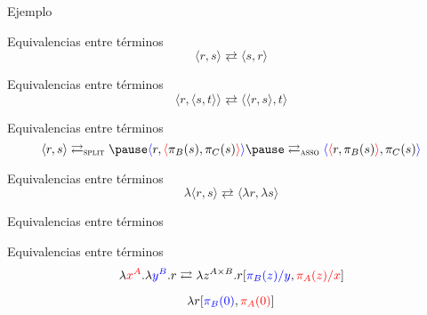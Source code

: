 \begin{frame}{Ejemplo}
\end{frame}

\begin{frame}{Equivalencias entre términos}
	\[ \langle r,s \rangle \rightleftarrows \langle s,r \rangle \]
\end{frame}

\begin{frame}{Equivalencias entre términos}
	\[ \langle r,\langle s,t \rangle \rangle \rightleftarrows \langle \langle r,s \rangle,t \rangle \]
\end{frame}

\begin{frame}{Equivalencias entre términos}	
	\[ \langle r,s \rangle \rightleftarrows_{\textsc{split}} \pause \textcolor{blue}{\langle} r, \textcolor{red}{\langle} \pi_B(s),\pi_C(s) \textcolor{red}{\rangle} \textcolor{blue}{\rangle} \pause \rightleftarrows_{\textsc{asso}} \textcolor{blue}{\langle} \textcolor{red}{\langle} r, \pi_B(s) \textcolor{red}{\rangle}, \pi_C(s) \textcolor{blue}{\rangle} \]
	\pause
\end{frame}

\begin{frame}{Equivalencias entre términos}	
	\[ \lambda \langle r, s \rangle \rightleftarrows \langle \lambda r, \lambda s \rangle \]
\end{frame}

\begin{frame}{Equivalencias entre términos}	
\end{frame}

\begin{frame}{Equivalencias entre términos}	
	\[ \lambda \textcolor{red}{x^A}. \lambda \textcolor{blue}{y^B}. r \rightleftarrows \lambda z^{A \times B}. r[\textcolor{blue}{\pi_B(z)/y}, \textcolor{red}{\pi_A(z)/x}] \]

	\pause
	\[ \lambda r[\textcolor{blue}{\pi_B(0)}, \textcolor{red}{\pi_A(0)}] \]
	
	\pause
	
	\pause
\end{frame}

